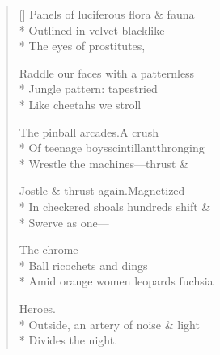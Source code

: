 \label{ch:in_the_arcades}
\settowidth{\versewidth}{Of teenage boys\qquad scintillant\qquad thronging}
\begin{verse}[\versewidth]
Panels of luciferous flora \& fauna\\*
Outlined in velvet black\qquad like\\*
The eyes of prostitutes,

Raddle our faces with a patternless\\*
Jungle pattern: tapestried\\*
Like cheetahs we stroll

The pinball arcades.\qquad A crush\\*
Of teenage boys\qquad scintillant\qquad thronging\\*
Wrestle the machines---thrust \&

Jostle \& thrust again.\qquad Magnetized\\*
In checkered shoals hundreds shift \&\\*
Swerve as one---

\hspace*{4\vgap} The chrome\\*
Ball ricochets and dings\\*
Amid orange women leopards fuchsia

\hspace*{4\vgap} Heroes.\\*
Outside, an artery of noise \& light\\*
Divides the night.
\end{verse}
